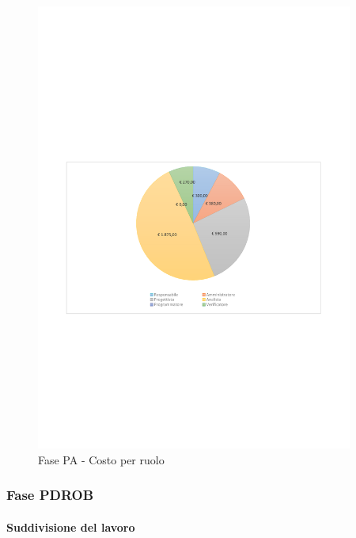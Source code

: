 \documentclass[../PianoProgetto.tex]{subfiles}
\begin{document}
	\begin{figure}[H]
		\centering
		\includegraphics[width=0.93\textwidth , trim=1.5cm 9cm 1.5cm 9cm]{grafici/PA/PA-costo}
			\caption{Fase PA - Costo per ruolo}
		\label{fig:CircleChart-fasePA_costo}
	\end{figure}	
\vfill	
	\subsubsection{Fase PDROB}
				\paragraph{Suddivisione del lavoro}\
					
\end{document}
